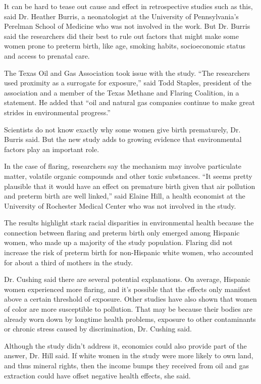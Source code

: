 It can be hard to tease out cause and effect in retrospective studies
such as this, said Dr. Heather Burris, a neonatologist at the University
of Pennsylvania's Perelman School of Medicine who was not involved in
the work. But Dr. Burris said the researchers did their best to rule out
factors that might make some women prone to preterm birth, like age,
smoking habits, socioeconomic status and access to prenatal care.

The Texas Oil and Gas Association took issue with the study. ``The
researchers used proximity as a surrogate for exposure,'' said Todd
Staples, president of the association and a member of the Texas Methane
and Flaring Coalition, in a statement. He added that ``oil and natural
gas companies continue to make great strides in environmental
progress.''

Scientists do not know exactly why some women give birth prematurely,
Dr. Burris said. But the new study adds to growing evidence that
environmental factors play an important role.

In the case of flaring, researchers say the mechanism may involve
particulate matter, volatile organic compounds and other toxic
substances. ``It seems pretty plausible that it would have an effect on
premature birth given that air pollution and preterm birth are well
linked,'' said Elaine Hill, a health economist at the University of
Rochester Medical Center who was not involved in the study.

The results highlight stark racial disparities in environmental health
because the connection between flaring and preterm birth only emerged
among Hispanic women, who made up a majority of the study population.
Flaring did not increase the risk of preterm birth for non-Hispanic
white women, who accounted for about a third of mothers in the study.

Dr. Cushing said there are several potential explanations. On average,
Hispanic women experienced more flaring, and it's possible that the
effects only manifest above a certain threshold of exposure. Other
studies have also shown that women of color are more susceptible to
pollution. That may be because their bodies are already worn down by
longtime health problems, exposure to other contaminants or chronic
stress caused by discrimination, Dr. Cushing said.

Although the study didn't address it, economics could also provide part
of the answer, Dr. Hill said. If white women in the study were more
likely to own land, and thus mineral rights, then the income bumps they
received from oil and gas extraction could have offset negative health
effects, she said.


